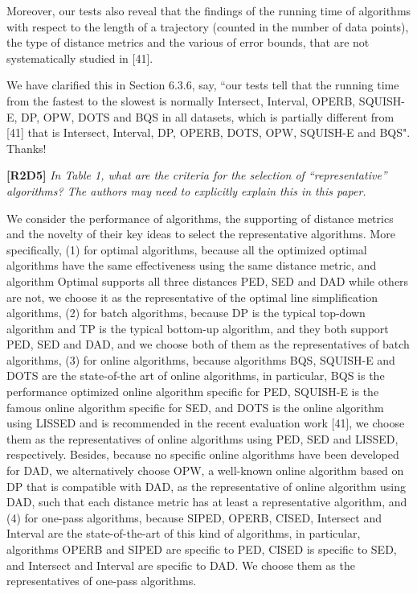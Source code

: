\documentclass{letter}
\begin{document}
Moreover, our tests also reveal that the findings of the running time of algorithms with respect to the length of a trajectory (counted in the number of data points), the type of distance metrics and the various of error bounds, that are not systematically studied in [41]. 



We have clarified this in Section 6.3.6, say, ``our tests tell that the running time from the fastest to the slowest is normally Intersect, Interval, OPERB, SQUISH-E, DP, OPW, DOTS and BQS in all datasets, which is partially different from [41] that is Intersect, Interval, DP, OPERB, DOTS, OPW, SQUISH-E and BQS". Thanks!




\textbf{[R2D5]} \emph{In Table 1, what are the criteria for the selection of ``representative'' algorithms? The authors may need to explicitly explain this in this paper.}

We consider the performance of algorithms, the supporting of distance metrics and the novelty of their key ideas to select the representative algorithms. More specifically,
(1) for optimal algorithms, {because all the optimized optimal algorithms have the same effectiveness using the same distance metric, and algorithm Optimal supports all three distances PED, SED and DAD while others are not, we choose it as the representative of the optimal line simplification algorithms,}
%
(2) for batch algorithms, {because DP is the typical top-down algorithm and TP is the typical bottom-up algorithm, and they both support PED, SED and DAD, and we choose  both of them as the representatives of batch algorithms,}
%
(3) for online algorithms, because algorithms BQS, SQUISH-E and DOTS are the state-of-the art of online algorithms, in particular, BQS is the performance optimized online algorithm specific for PED, SQUISH-E is the famous online algorithm specific for SED, and {DOTS is the online algorithm using LISSED and is recommended in the recent evaluation work [41]}, we choose them as the representatives of online algorithms using PED, SED and {LISSED}, respectively. Besides, because no specific online algorithms have been developed for DAD, we alternatively choose OPW, a well-known online algorithm based on DP that is compatible with DAD, as the representative of online algorithm using DAD, such that each distance metric has at least a representative algorithm, and
%
(4) for one-pass algorithms, because SIPED, OPERB, CISED, Intersect and Interval are the state-of-the-art of this kind of algorithms, in particular, algorithms OPERB and SIPED are specific to PED, CISED is specific to SED, and Intersect and Interval are specific to DAD. We choose them as the representatives of one-pass algorithms.
\end{document}
